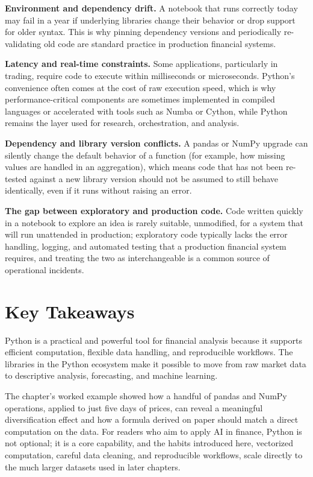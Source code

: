 \documentclass[../ai_in_finance]{subfiles}
\begin{document}
\textbf{Environment and dependency drift.} A notebook that runs correctly today may fail in a year if underlying libraries change their behavior or drop support for older syntax. This is why pinning dependency versions and periodically re-validating old code are standard practice in production financial systems.

\textbf{Latency and real-time constraints.} Some applications, particularly in trading, require code to execute within milliseconds or microseconds. Python's convenience often comes at the cost of raw execution speed, which is why performance-critical components are sometimes implemented in compiled languages or accelerated with tools such as Numba or Cython, while Python remains the layer used for research, orchestration, and analysis.

\textbf{Dependency and library version conflicts.} A pandas or NumPy upgrade can silently change the default behavior of a function (for example, how missing values are handled in an aggregation), which means code that has not been re-tested against a new library version should not be assumed to still behave identically, even if it runs without raising an error.

\textbf{The gap between exploratory and production code.} Code written quickly in a notebook to explore an idea is rarely suitable, unmodified, for a system that will run unattended in production; exploratory code typically lacks the error handling, logging, and automated testing that a production financial system requires, and treating the two as interchangeable is a common source of operational incidents.

\section{Key Takeaways}

Python is a practical and powerful tool for financial analysis because it supports efficient computation, flexible data handling, and reproducible workflows. The libraries in the Python ecosystem make it possible to move from raw market data to descriptive analysis, forecasting, and machine learning.

The chapter's worked example showed how a handful of pandas and NumPy operations, applied to just five days of prices, can reveal a meaningful diversification effect and how a formula derived on paper should match a direct computation on the data. For readers who aim to apply AI in finance, Python is not optional; it is a core capability, and the habits introduced here, vectorized computation, careful data cleaning, and reproducible workflows, scale directly to the much larger datasets used in later chapters.
\end{document}
